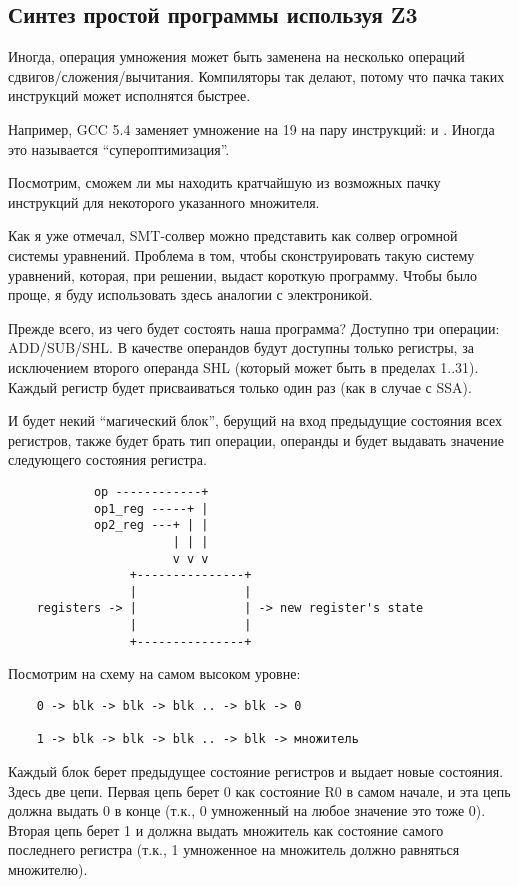 \subsection{Синтез простой программы используя Z3}

Иногда, операция умножения может быть заменена на несколько операций сдвигов/сложения/вычитания.
Компиляторы так делают, потому что пачка таких инструкций может исполнятся быстрее.

Например, GCC 5.4 заменяет умножение на 19 на пару инструкций:  и
.
Иногда это называется ``супероптимизация''.

Посмотрим, сможем ли мы находить кратчайшую из возможных пачку инструкций для некоторого указанного множителя.

Как я уже отмечал, SMT-солвер можно представить как солвер огромной системы уравнений.
Проблема в том, чтобы сконструировать такую систему уравнений, которая, при решении, выдаст короткую программу.
Чтобы было проще, я буду использовать здесь аналогии с электроникой.

Прежде всего, из чего будет состоять наша программа? Доступно три операции: ADD/SUB/SHL.
В качестве операндов будут доступны только регистры, за исключением второго операнда SHL
(который может быть в пределах 1..31).
Каждый регистр будет присваиваться только один раз (как в случае с \ac{SSA}).

И будет некий ``магический блок'', берущий на вход предыдущие состояния всех регистров, также будет брать тип операции,
операнды и будет выдавать значение следующего состояния регистра.

\begin{lstlisting}
	        op ------------+
	        op1_reg -----+ |
	        op2_reg ---+ | |
	                   | | |
	                   v v v
	             +---------------+
	             |               |
	registers -> |               | -> new register's state
	             |               |
	             +---------------+
\end{lstlisting}

Посмотрим на схему на самом высоком уровне:

\begin{lstlisting}
	0 -> blk -> blk -> blk .. -> blk -> 0

	1 -> blk -> blk -> blk .. -> blk -> множитель
\end{lstlisting}

Каждый блок берет предыдущее состояние регистров и выдает новые состояния.
Здесь две цепи.
Первая цепь берет 0 как состояние R0 в самом начале, и эта цепь должна выдать 0 в конце
(т.к., 0 умноженный на любое значение это тоже 0).
Вторая цепь берет 1 и должна выдать множитель как состояние самого последнего регистра
(т.к., 1 умноженное на множитель должно равняться множителю).

